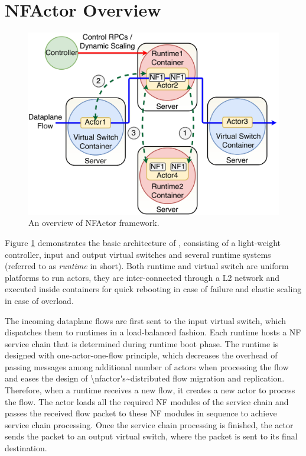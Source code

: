 \section {NFActor Overview}

\begin{figure}[!t]
  \centering
  \includegraphics[width=\columnwidth]{figure/final-final-nfactor-cluster.pdf}
  \caption{An overview of NFActor framework.}
  \label{fig:runtime}
\end{figure}

Figure \ref{fig:runtime} demonstrates the basic architecture of \nfactor, consisting of a light-weight controller, input and output virtual switches and several runtime systems (referred to as \textit{runtime} in short). \ac{Both runtime and virtual switch are uniform platforms to run actors, they are inter-connected through a L2 network and executed inside containers for quick rebooting in case of failure and elastic scaling in case of overload.} 


The incoming dataplane flows are first sent to the input virtual switch, which dispatches them to runtimes in a load-balanced fashion. \ac{Each runtime hosts a NF service chain that is determined during runtime boot phase. The runtime is designed with one-actor-one-flow principle, which decreases the overhead of passing messages among additional number of actors when processing the flow and eases the design of \nfactor's~distributed flow migration and replication.}
Therefore, when a runtime receives a new flow, it creates a new actor to process the flow. The actor loads all the required NF modules of the service chain and passes the received flow packet to these NF modules in sequence to achieve service chain processing. Once the service chain processing is finished, the actor sends the packet to an output virtual switch, where the packet is sent to its final destination.

